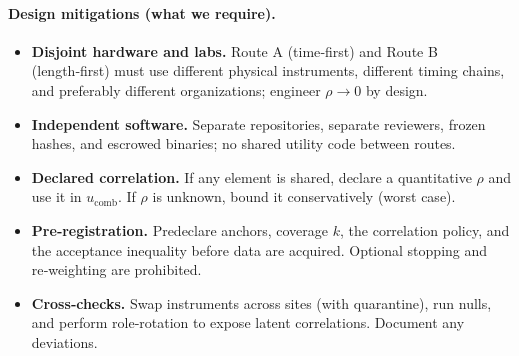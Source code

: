 \documentclass[11pt]{article}
\begin{document}
\paragraph{Design mitigations (what we require).}
\begin{itemize}
  \item \textbf{Disjoint hardware and labs.} Route A (time‑first) and Route B (length‑first) must use different physical instruments, different timing chains, and preferably different organizations; engineer \(\rho \to 0\) by design.
  \item \textbf{Independent software.} Separate repositories, separate reviewers, frozen hashes, and escrowed binaries; no shared utility code between routes.
  \item \textbf{Declared correlation.} If any element is shared, declare a quantitative \(\rho\) and use it in \(u_{\mathrm{comb}}\). If \(\rho\) is unknown, bound it conservatively (worst case).
  \item \textbf{Pre‑registration.} Predeclare anchors, coverage \(k\), the correlation policy, and the acceptance inequality before data are acquired. Optional stopping and re‑weighting are prohibited.
  \item \textbf{Cross‑checks.} Swap instruments across sites (with quarantine), run nulls, and perform role‑rotation to expose latent correlations. Document any deviations.
\end{itemize}
\end{document}
